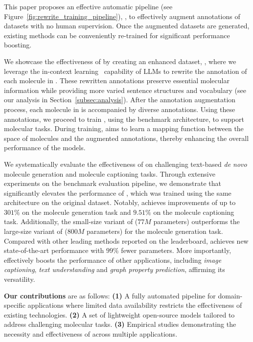 This paper proposes an effective automatic pipeline (see Figure~\ref{fig:rewrite_training_pipeline}), \pipeline, to effectively augment annotations of datasets with no human supervision.
Once the augmented datasets are generated, existing methods can be conveniently re-trained for significant performance boosting. 

We showcase the effectiveness of \pipeline by creating an enhanced dataset, \newdataset, where we leverage the in-context learning~\cite{LYFJ23} capability of LLMs to rewrite the annotation of each molecule in \olddataset. 
These rewritten annotations preserve essential molecular information while providing more varied sentence structures and vocabulary (see our analysis in Section~\ref{subsec:analysis}). 
% 
After the annotation augmentation process, each molecule in \newdataset is accompanied by diverse annotations. 
Using these annotations, we proceed to train \newmodel, using the benchmark \oldmodel architecture, to support molecular tasks. 
During training, \newmodel aims to learn a mapping function between the space of molecules and the augmented annotations, thereby enhancing the overall performance of the models.

We systematically evaluate the effectiveness of \newmodel on challenging text-based \emph{de novo} molecule generation and molecule captioning tasks. 
Through extensive experiments on the benchmark evaluation pipeline, we demonstrate that \newmodel significantly elevates the performance of \oldmodel, which was trained using the same architecture on the original \olddataset dataset. 
Notably, \newmodel achieves improvements of up to $301\%$ on the molecule generation task and $9.51\%$ on the molecule captioning task.
% 
Additionally, the small-size variant of \newmodel ($77M$ parameters) outperforms the large-size variant of \oldmodel ($800M$ parameters) for the molecule generation task. 
% 
Compared with other leading methods reported on the leaderboard, \newmodel achieves new state-of-the-art performance with $99\%$ fewer parameters.
% 
More importantly, \pipeline effectively boosts the performance of other applications, including \emph{image captioning}, \emph{text understanding} and \emph{graph property prediction}, affirming its versatility.

\smallskip 
\noindent \textbf{Our contributions} are as follows: 
\textbf{(1)} A fully automated pipeline for domain-specific applications where limited data availability restricts the effectiveness of existing technologies. 
\textbf{(2)} A set of lightweight open-source models tailored to address challenging molecular tasks. 
\textbf{(3)} Empirical studies demonstrating the necessity and effectiveness of \pipeline across multiple applications.
